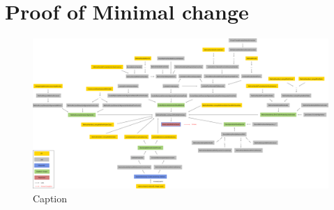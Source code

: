 \chapter{Proof of Minimal change}\label{minimal_change}

\begin{figure}
    \centering
    \includegraphics[angle=90,origin=c,scale=0.22]{resources/Group 397.png}
    \caption{Caption}
    \label{fig:define_class_0}
\end{figure}
